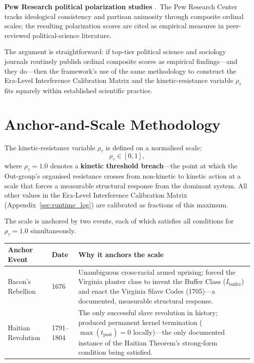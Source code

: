\documentclass[12pt,openany]{book}
\numberwithin{equation}{chapter}
\begin{document}
\textbf{Pew Research political polarization studies} \cite{pew_polarization}.\ The Pew Research Center tracks ideological consistency and partisan animosity through composite ordinal scales; the resulting polarization scores are cited as empirical measures in peer-reviewed political-science literature.

The argument is straightforward: if top-tier political science and sociology journals routinely publish ordinal composite scores as empirical findings---and they do---then the framework's use of the same methodology to construct the Era-Level Interference Calibration Matrix and the kinetic-resistance variable $\rho_\tau$ fits squarely within established scientific practice.

\section*{Anchor-and-Scale Methodology}

The kinetic-resistance variable $\rho_\tau$ is defined on a normalised scale:
\[
  \rho_\tau \in [0, 1],
\]
where $\rho_\tau = 1.0$ denotes a \textbf{kinetic threshold breach}---the point at which the Out-group's organised resistance crosses from non-kinetic to kinetic action at a scale that forces a measurable structural response from the dominant system. All other values in the Era-Level Interference Calibration Matrix (Appendix~\ref{sec:runtime_log}) are calibrated as fractions of this maximum.

The scale is anchored by two events, each of which satisfies all conditions for $\rho_\tau = 1.0$ simultaneously.

\medskip
\begin{center}
\begin{tabular}{p{3.2cm} p{2.2cm} p{8.0cm}}
\toprule
\textbf{Anchor Event} & \textbf{Date} & \textbf{Why it anchors the scale} \\
\midrule
Bacon's Rebellion \cite{dubois,morgan_american_slavery} & 1676 & Unambiguous cross-racial armed uprising; forced the Virginia planter class to invent the Buffer Class ($I_{\text{buffer}}$) and enact the Virginia Slave Codes (1705)---a documented, measurable structural response. \\[6pt]
Haitian Revolution \cite{james_black_jacobins,dubois} & 1791--1804 & The only successful slave revolution in history; produced permanent kernel termination ($\max(t_{\text{post}}) = 0$ locally)---the only documented instance of the Haitian Theorem's strong-form condition being satisfied. \\
\bottomrule
\end{tabular}
\end{center}
\medskip
\end{document}
